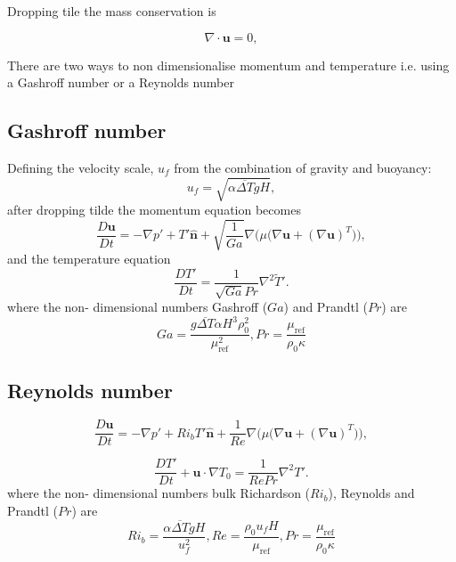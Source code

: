 \documentclass[preprint,12pt]{article}
\begin{document}
Dropping tile the mass conservation is
\begin{tcolorbox}
\begin{equation}\label{eq:direct_incompressibility}
{\nabla}\cdot{\mathbf{u}}=0,
\end{equation}
\end{tcolorbox}
There are two ways to non dimensionalise momentum and temperature i.e. using a Gashroff number or a Reynolds number
\subsection{Gashroff number}
Defining the velocity scale, $u_f$ from the combination of gravity and buoyancy:
\begin{equation}
u_f=\sqrt{\alpha  \overline{\Delta T} g H},
\end{equation}
after dropping tilde the momentum equation becomes
\begin{equation}
\frac{D{\mathbf{u}}}{D{t}}=-{\nabla} {p'}+{T'} \mathbf{\hat{n}}+\sqrt{\frac{1}{Ga}}{\nabla}\Big({\mu}\big({\nabla} \mathbf{{u}}+({\nabla} \mathbf{{u}})^T\big)\Big),
\end{equation}
and the temperature equation
\begin{equation}
\frac{D{T}'}{D{t}}=\frac{1}{\sqrt{Ga }Pr} \nabla^2\tilde{T}'.
\end{equation}
where the non- dimensional numbers Gashroff ($Ga$) and Prandtl ($Pr$) are 
\begin{equation}
Ga=\frac{g\overline{\Delta T} \alpha H^3 \rho_0^2}{\mu_\text{ref}^2}, Pr=\frac{\mu_\text{ref}}{\rho_0 \kappa}
\end{equation}
\subsection{Reynolds number}
\begin{tcolorbox}
\begin{equation}\label{eq:direct_momentum}
\frac{D{\mathbf{u}}}{D{t}}=-{\nabla} {p'}+{Ri_bT'} \mathbf{\hat{n}}+{\frac{1}{Re}}{\nabla}\Big({\mu}\big({\nabla} \mathbf{{u}}+({\nabla} \mathbf{{u}})^T\big)\Big),
\end{equation}

\begin{equation}\label{eq:direct_scalar}
\frac{D{T}'}{D{t}}+{\mathbf{u}}\cdot \nabla {T_0}=\frac{1}{{Re }Pr} \nabla^2{T}'.
\end{equation}
where the non- dimensional numbers bulk Richardson ($Ri_b$), Reynolds and Prandtl ($Pr$) are 
\begin{equation}
Ri_b=\frac{\alpha {\overline{\Delta T}}g H}{u_f^2}, Re=\frac{\rho_0 u_f H}{\mu_\text{ref}},  Pr=\frac{\mu_\text{ref}}{\rho_0 \kappa}
\end{equation}
\end{tcolorbox}
\end{document}
